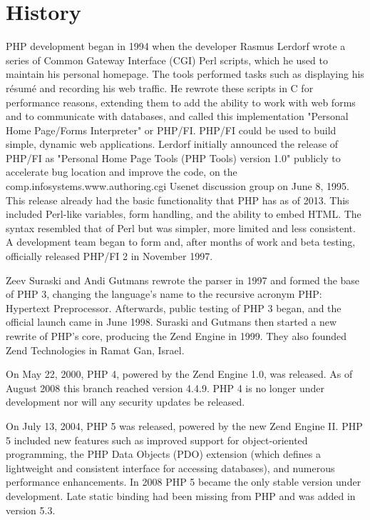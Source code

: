 \chapter{History}


PHP development began in 1994 when the developer Rasmus Lerdorf wrote a series of Common Gateway Interface (CGI) Perl scripts, which he used to maintain his personal homepage. The tools performed tasks such as displaying his résumé and recording his web traffic. He rewrote these scripts in C for performance reasons, extending them to add the ability to work with web forms and to communicate with databases, and called this implementation "Personal Home Page/Forms Interpreter" or PHP/FI. PHP/FI could be used to build simple, dynamic web applications. Lerdorf initially announced the release of PHP/FI as "Personal Home Page Tools (PHP Tools) version 1.0" publicly to accelerate bug location and improve the code, on the comp.infosystems.www.authoring.cgi Usenet discussion group on June 8, 1995. This release already had the basic functionality that PHP has as of 2013. This included Perl-like variables, form handling, and the ability to embed HTML. The syntax resembled that of Perl but was simpler, more limited and less consistent. A development team began to form and, after months of work and beta testing, officially released PHP/FI 2 in November 1997.


Zeev Suraski and Andi Gutmans rewrote the parser in 1997 and formed the base of PHP 3, changing the language's name to the recursive acronym PHP: Hypertext Preprocessor. Afterwards, public testing of PHP 3 began, and the official launch came in June 1998. Suraski and Gutmans then started a new rewrite of PHP's core, producing the Zend Engine in 1999. They also founded Zend Technologies in Ramat Gan, Israel.

On May 22, 2000, PHP 4, powered by the Zend Engine 1.0, was released. As of August 2008 this branch reached version 4.4.9. PHP 4 is no longer under development nor will any security updates be released.

On July 13, 2004, PHP 5 was released, powered by the new Zend Engine II. PHP 5 included new features such as improved support for object-oriented programming, the PHP Data Objects (PDO) extension (which defines a lightweight and consistent interface for accessing databases), and numerous performance enhancements. In 2008 PHP 5 became the only stable version under development. Late static binding had been missing from PHP and was added in version 5.3.

